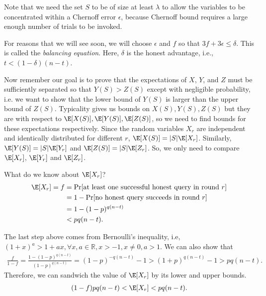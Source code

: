 Note that we need the set $S$ to be of size at least $\lambda$ to allow the variables to be concentrated within a Chernoff error $\epsilon$, because Chernoff bound requires a large enough number of trials to be invoked.

For reasons that we will see soon, we will choose $\epsilon$ and $f$ so that $3f + 3\epsilon \leq \delta$. This is called the \emph{balancing equation}. Here, $\delta$ is the honest advantage, i.e., $t < (1-\delta)(n-t)$.

Now remember our goal is to prove that the expectations of $X$, $Y$, and $Z$ must be sufficiently separated so that $Y(S) > Z(S)$ except with negligible probability, i.e. we want to show that the lower bound of $Y(S)$ is larger than the upper bound of $Z(S)$. Typicality gives us bounds on $X(S), Y(S), Z(S)$ but they are with respect to $\E[X(S)], \E[Y(S)], \E[Z(S)]$, so we need to find bounds for these expectations respectively.
Since the random variables $X_r$ are independent and identically distributed for different $r$, $\E[X(S)] = |S|\E[X_r]$. Similarly, $\E[Y(S)] = |S|\E[Y_r]$ and $\E[Z(S)] = |S|\E[Z_r]$. So, we only need to compare $\E[X_r]$, $\E[Y_r]$ and $\E[Z_r]$.

What do we know about $\E[X_r]$?
\begin{align}
    \E[X_r] = f &= \Pr [\text{at least one successful honest query in round $r$}] \nonumber \\
    & = 1 - \Pr [\text{no honest query succeeds in round $r$}] \nonumber \\
    & = 1 - (1-p)^{q(n-t)} \nonumber \\
    & < pq(n-t).
\end{align}

The last step above comes from Bernoulli's inequality, i.e,  $(1+x)^a > 1+ax, \forall x, a \in \mathbb{R}, x > -1, x \neq 0, a > 1$. We can also show that
\begin{align}
\label{eq:f_lower_bound}
    \frac{f}{1-f} = \frac{1-(1-p)^{q(n-t)}}{(1-p)^{q(n-t)}} = (1-p)^{-q(n-t)} -1 > (1+p)^{q(n-t)} - 1 > pq(n-t).
\end{align}
Therefore, we can sandwich the value of $\E[X_r]$ by its lower and upper bounds.
\begin{align}
    (1-f)pq(n-t) < \E[X_r] < pq(n-t).
\end{align}


